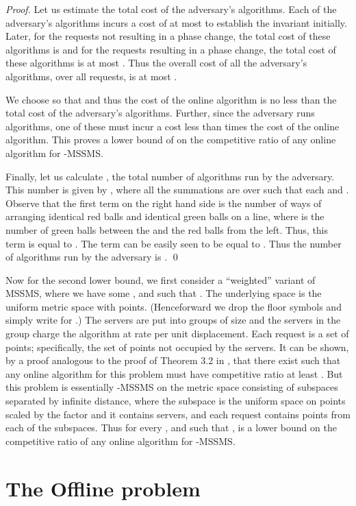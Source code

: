 \documentclass[11pt]{article}
\theoremstyle{plain}\newtheorem{theorem}{Theorem}
\theoremstyle{definition}
\theoremstyle{remark}
\begin{document}
\begin{proof}
Let us estimate the total cost of the adversary's  algorithms. Each of the adversary's algorithms incurs a cost of at most  to establish the invariant initially. Later, for the  requests not resulting in a phase change, the total cost of these algorithms is  and for the  requests resulting in a phase change, the total cost of these algorithms is at most . Thus the overall cost of all the adversary's algorithms, over all requests, is at most .

We choose  so that 
and thus the cost of the online algorithm is no less than the total cost of the adversary's algorithms. Further, since the adversary runs  algorithms, one of these must incur a cost less than  times the cost of the online algorithm. This proves a lower bound of  on the competitive ratio of any online algorithm for -MSSMS.

Finally, let us calculate , the total number of algorithms run by the adversary. This number is given by , where all the summations are over  such that each  and .
Observe that the first term on the right hand side is the number of ways of arranging  identical red balls and  identical green balls on a line, where  is the number of green balls between the  and the  red balls from the left. Thus, this term is equal to . The term  can be easily seen to be equal to . Thus the number of algorithms run by the adversary is . \qed
\end{proof}

Now for the second lower bound, we first consider a ``weighted'' variant of MSSMS, where we have some , and  such that . The underlying space is the uniform metric space with  points. (Henceforward we drop the floor symbols and simply write  for .) The servers are put into  groups of size  and the servers in the  group charge the algorithm at rate  per unit displacement. Each request is a set of  points; specifically, the set of points not occupied by the servers. It can be shown, by a proof analogous to the proof of Theorem 3.2 in \cite{FiatR94}, that there exist  such that any online algorithm for this problem must have competitive ratio at least . But this problem is essentially -MSSMS on the metric space consisting of  subspaces separated by infinite distance, where the  subspace is the uniform space on  points scaled by the factor  and it contains  servers, and each request contains  points from each of the subspaces. Thus for every , and  such that ,  is a lower bound on the competitive ratio of any online algorithm for -MSSMS.

\section{The Offline problem}\label{sec_offline}
\end{document}
